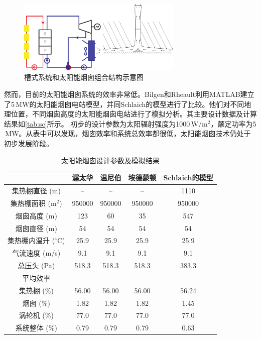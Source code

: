 \begin{figure}[!ht]
\centering 
\includegraphics[width=0.7\textwidth]{fig/CombinedSolarChimney}
\caption{槽式系统和太阳能烟囱组合结构示意图}\label{fig:CombinedSolarChimney}
\end{figure}
然而，目前的太阳能烟囱系统的效率非常低。Bilgen和Rheault利用MATLAB建立了5$\,\mathrm{MW}$的太阳能烟囱电站模型，并同Schlaich的模型进行了比较\cite{Bilgen2005}。他们对不同地理位置，不同烟囱高度的太阳能烟囱电站进行了模拟分析。其主要设计数据及计算结果如\autoref{tab:sc}所示。 初步的设计参数为太阳辐射强度为1000$\,\mathrm{W/m^2}$，额定功率为5$\,\mathrm{MW}$。从表中可以发现，烟囱效率和系统总效率都很低，太阳能烟囱技术仍处于初步发展阶段。
\begin{table}[htbp]
	\caption{太阳能烟囱设计参数及模拟结果}
	\centering
	\begin{tabular}{ccccc}
		\toprule
			&渥太华    &温尼伯    &埃德蒙顿    &Schlaich的模型\\
		\midrule
		集热棚直径 (m)    &	--	&	--	&	--	&	1110 \\
  集热棚面积 ($\mathrm{m^2}$)    & 950000    & 950000	&	950000	&	950000\\
  烟囱高度 (m)    &123    &60    &    35&    547\\
  烟囱直径 (m)    &54    &54    &54    &54\\
  集热棚内温升 ($\mathrm{^\circ C}$)    &25.9    &25.9    &25.9    &25.9\\
  气流速度 (m/s)&9.1    &9.1    &9.1    &9.1\\
  总压头 (Pa)&518.3    &518.3    &518.3    &383.3\\
  平均效率\\
  集热棚 (\%)    &56.00    &56.00    &56.00    &56.24\\
  烟囱 (\%)    &1.82    &1.82    &1.82    &1.45\\
  涡轮机 (\%)    &77.0    &77.0    &77.0    &77.0\\
  系统整体 (\%)    &0.79    &0.79    &0.79    &0.63\\
		\bottomrule
	\end{tabular}
	\label{tab:sc}
\end{table}
 
